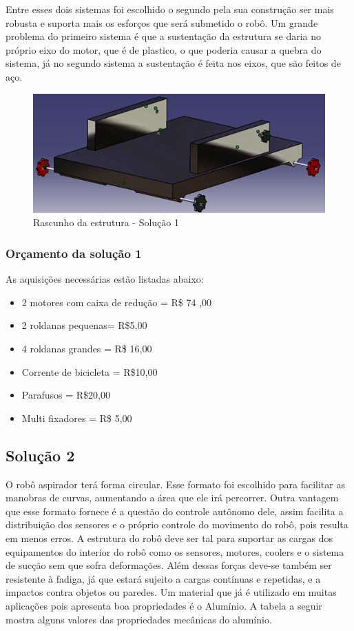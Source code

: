 		Entre esses dois sistemas foi escolhido o segundo pela sua construção ser mais robusta e suporta mais os esforços que será submetido o robô. Um grande problema do primeiro sistema é que a sustentação da estrutura se daria no próprio eixo do motor, que é de plastico, o que poderia causar a quebra do sistema, já no segundo sistema a sustentação é feita nos eixos, que são feitos de aço.
		
		\begin{figure}[H]
			\centering
			\includegraphics[scale=0.8]{figuras/rascunho_estrutura.png}
			\caption{Rascunho da estrutura - Solução 1}
			\label{img:rascunho1}
		\end{figure}

		\subsubsection{Orçamento da solução 1}

			As aquisições necessárias estão listadas abaixo:
			\begin{itemize}
				\item 2 motores com caixa de redução = R\$ 74 ,00
				\item 2 roldanas pequenas= R\$5,00
				\item 4 roldanas grandes = R\$ 16,00
				\item Corrente de bicicleta = R\$10,00
				\item Parafusos = R\$20,00
				\item Multi fixadores = R\$ 5,00
			\end{itemize}

		\subsection{Solução 2} %
		\label{sub:solução_2}
			
			O robô aspirador terá forma circular. Esse formato foi escolhido para facilitar as manobras de curvas, aumentando a área que ele irá percorrer. Outra vantagem que esse formato fornece é a questão do controle autônomo dele, assim facilita a distribuição dos sensores e o próprio controle do movimento do robô, pois resulta em menos erros. A estrutura do robô deve ser tal para suportar as cargas dos equipamentos do interior do robô como os sensores, motores, coolers e o sistema de sucção sem que sofra deformações. Além dessas forças deve-se também ser resistente à fadiga, já que estará sujeito a cargas contínuas e repetidas, e a impactos contra objetos ou paredes. Um material que já é utilizado em muitas aplicações pois apresenta boa propriedades é o Alumínio. A tabela a seguir mostra alguns valores das propriedades mecânicas do alumínio.

